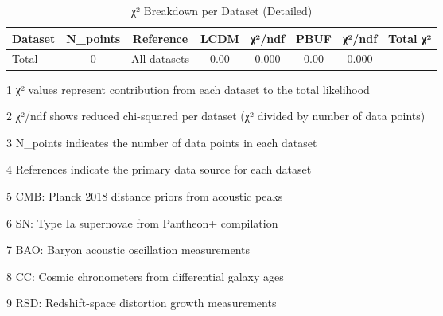 \begin{table}[htbp]
\centering
\caption{χ² Breakdown per Dataset (Detailed)}
\label{tab:χ²_breakdown_per_dataset_(detailed)}
\begin{tabular}{lccccccc}
\hline
Dataset & N_points & Reference & LCDM & χ²/ndf & PBUF & χ²/ndf & Total χ² \\
\hline
Total & 0 & All datasets & 0.00 & 0.000 & 0.00 & 0.000 &  \\
\hline
\end{tabular}
\begin{tablenotes}
\small
\item[1] χ² values represent contribution from each dataset to the total likelihood
\item[2] χ²/ndf shows reduced chi-squared per dataset (χ² divided by number of data points)
\item[3] N_points indicates the number of data points in each dataset
\item[4] References indicate the primary data source for each dataset
\item[5] CMB: Planck 2018 distance priors from acoustic peaks
\item[6] SN: Type Ia supernovae from Pantheon+ compilation
\item[7] BAO: Baryon acoustic oscillation measurements
\item[8] CC: Cosmic chronometers from differential galaxy ages
\item[9] RSD: Redshift-space distortion growth measurements
\end{tablenotes}
\end{table}
